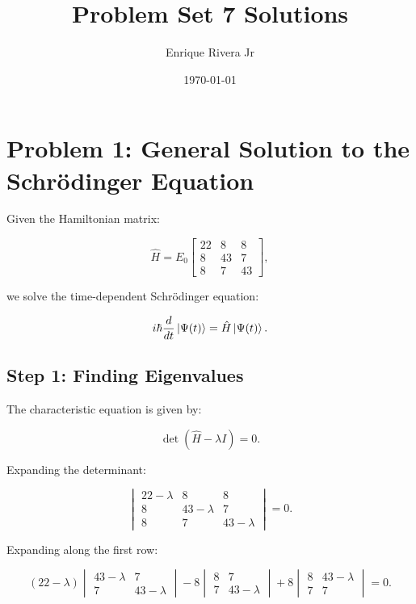 \documentclass[12pt]{article}
\begin{document}
\title{Problem Set 7 Solutions}
\author{Enrique Rivera Jr}
\date{\today}

\maketitle

\section*{Problem 1: General Solution to the Schr\"odinger Equation}

Given the Hamiltonian matrix:

\begin{equation}
    \hat{H} = E_0 \begin{bmatrix} 22 & 8 & 8 \\ 8 & 43 & 7 \\ 8 & 7 & 43 \end{bmatrix},
\end{equation}

we solve the time-dependent Schr\"odinger equation:

\begin{equation}
    i\hbar \frac{d}{dt} \ket{\Psi(t)} = \hat{H} \ket{\Psi(t)}.
\end{equation}

\subsection*{Step 1: Finding Eigenvalues}
The characteristic equation is given by:

\begin{equation}
    \det(\hat{H} - \lambda I) = 0.
\end{equation}

Expanding the determinant:

\begin{equation}
    \begin{vmatrix} 22 - \lambda & 8 & 8 \\ 8 & 43 - \lambda & 7 \\ 8 & 7 & 43 - \lambda \end{vmatrix} = 0.
\end{equation}

Expanding along the first row:

\begin{equation}
    (22 - \lambda) \begin{vmatrix} 43 - \lambda & 7 \\ 7 & 43 - \lambda \end{vmatrix}
    - 8 \begin{vmatrix} 8 & 7 \\ 7 & 43 - \lambda \end{vmatrix}
    + 8 \begin{vmatrix} 8 & 43 - \lambda \\ 7 & 7 \end{vmatrix} = 0.
\end{equation}
\end{document}
